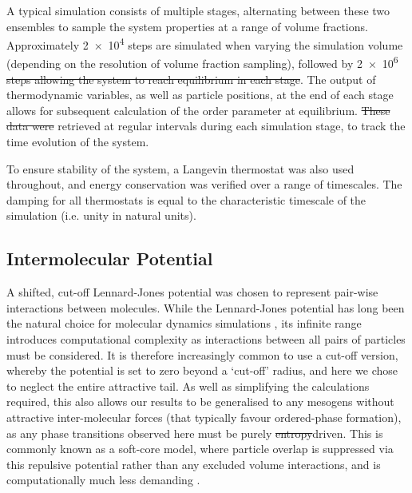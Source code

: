\documentclass[11pt, a4paper]{article} %
\providecommand{\DIFadd}[1]{{\protect\color{blue}\uwave{#1}}} %
\providecommand{\DIFdel}[1]{{\protect\color{red}\sout{#1}}}                      %
\providecommand{\DIFaddbegin}{} %
\providecommand{\DIFaddend}{} %
\providecommand{\DIFdelbegin}{} %
\providecommand{\DIFdelend}{} %
\begin{document}
A typical simulation consists of multiple stages, alternating between these two ensembles to sample the system properties at a range of volume fractions. Approximately \num{2e4} steps are simulated when varying the simulation volume (depending on the resolution of volume fraction sampling), followed by \num{2e6} \DIFdelbegin \DIFdel{steps allowing the system to reach equilibrium in each stage}\DIFdelend \DIFaddbegin \DIFadd{\textcolor{forestgreen}{steps, allowing the system to reach equilibrium at each stage}}\DIFaddend . The output of thermodynamic variables, as well as particle positions, at the end of each stage allows for subsequent calculation of the order parameter at equilibrium. \DIFdelbegin \DIFdel{These data were }\DIFdelend \DIFaddbegin \DIFadd{\textcolor{forestgreen}{These data were} }\DIFaddend retrieved at regular intervals during each simulation stage, to track the time evolution of the system.

To ensure stability of the system, a Langevin thermostat \cite{Schneider1978} was also used throughout, and energy conservation was verified over a range of timescales. The damping for all thermostats is equal to the characteristic timescale of the simulation (i.e. unity in natural units).



\subsection{Intermolecular Potential} \label{pair_potential}
A shifted, cut-off Lennard-Jones potential was chosen to represent pair-wise interactions between molecules. While the Lennard-Jones potential \cite{Jones1924a, Jones1924b} has long been the natural choice for molecular dynamics simulations \cite{Stephan2019}, its infinite range introduces computational complexity as interactions between all pairs of particles must be considered. It is therefore increasingly common to use a cut-off version, whereby the potential is set to zero beyond a `cut-off' radius, and here we chose to neglect the entire attractive tail. As well as simplifying the calculations required, this also allows our results to be generalised to any mesogens without attractive inter-molecular forces (that typically favour ordered-phase formation), as any phase transitions observed here must be purely \DIFdelbegin \DIFdel{entropy\textendash }\DIFdelend \DIFaddbegin \DIFadd{entropically }\DIFaddend driven. This is commonly known as a soft-core model, where particle overlap is suppressed via this repulsive potential rather than any excluded volume interactions, and is computationally much less demanding \cite{Paolini1993, Hughes2008}.
\end{document}
